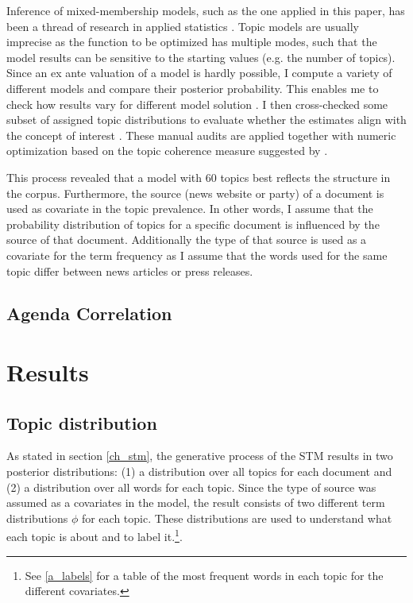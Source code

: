 \documentclass[12pt,a4paper,notitlepage]{article}
\begin{document}
Inference of mixed-membership models, such as the one applied in this paper, has been a thread of research in applied statistics \citep{blei_latent_2003, erosheva_mixed-membership_2004, braun_variational_2010}. Topic models are usually imprecise as the function to be optimized has multiple modes, such that the model results can be sensitive to the starting values (e.g. the number of topics). Since an ex ante valuation of a model is hardly possible, I compute a variety of different models and compare their posterior probability. This enables me to check how results vary for different model solution \citep{roberts_navigating_2016}. I then cross-checked some subset of assigned topic distributions to evaluate whether the estimates align with the concept of interest \citep{gentzkow_text_2017}. These manual audits are applied together with numeric optimization based on the topic coherence measure suggested by \citet{mimno_optimizing_2011}. 

This process revealed that a model with 60 topics best reflects the structure in the corpus. Furthermore, the source (news website or party) of a document is used as covariate in the topic prevalence. In other words, I assume that the probability distribution of topics for a specific document is influenced by the source of that document. Additionally the type of that source is used as a covariate for the term frequency as I assume that the words used for the same topic differ between news articles or press releases.  

\subsection{Agenda Correlation}\label{ch_agendacorrl}



\section{Results}

\subsection{Topic distribution} 

As stated in section \ref{ch_stm}, the generative process of the STM results in two posterior distributions: (1) a distribution over all topics for each document and (2) a distribution over all words for each topic. Since the type of source was assumed as a covariates in the model, the result consists of two different term distributions $\phi$ for each topic. These distributions are used to understand what each topic is about and to label it.\footnote{See \ref{a_labels} for a table of the most frequent words in each topic for the different covariates.}.
\end{document}
